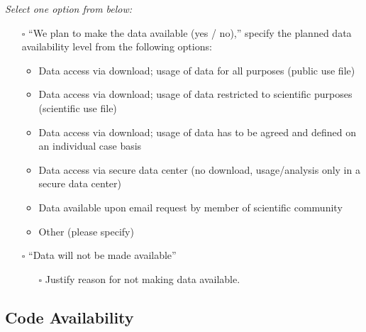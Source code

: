 \documentclass[
]{article}
\providecommand{\tightlist}{%
  \setlength{\itemsep}{0pt}\setlength{\parskip}{0pt}}\usepackage{longtable,booktabs,array}
\begin{document}
\begin{tcolorbox}[enhanced jigsaw, rightrule=.15mm, titlerule=0mm, coltitle=black, opacityback=0, bottomrule=.15mm, colback=white, opacitybacktitle=0.6, title=\textcolor{quarto-callout-caution-color}{\faFire}\hspace{0.5em}{Preregistration Item}, toprule=.15mm, colframe=quarto-callout-caution-color-frame, left=2mm, leftrule=.75mm, breakable, bottomtitle=1mm, colbacktitle=quarto-callout-caution-color!10!white, toptitle=1mm, arc=.35mm]

\emph{Select one option from below:}

\begin{itemize}
\tightlist
\item[$\square$]
  ``We plan to make the data available (yes / no),'' specify the planned
  data availability level from the following options:

  \begin{itemize}
  \tightlist
  \item
    Data access via download; usage of data for all purposes (public use
    file)
  \item
    Data access via download; usage of data restricted to scientific
    purposes (scientific use file)
  \item
    Data access via download; usage of data has to be agreed and defined
    on an individual case basis
  \item
    Data access via secure data center (no download, usage/analysis only
    in a secure data center)
  \item
    Data available upon email request by member of scientific community
  \item
    Other (please specify)
  \end{itemize}
\item[$\square$]
  ``Data will not be made available''

  \begin{itemize}
  \tightlist
  \item[$\square$]
    Justify reason for not making data available.
  \end{itemize}
\end{itemize}

\end{tcolorbox}

\subsection*{Code Availability}\label{code-availability}
\end{document}
